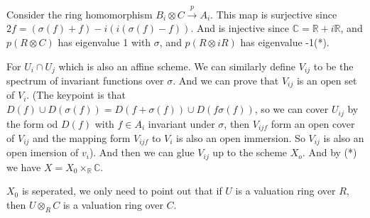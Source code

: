 \documentclass[10pt,letterpaper]{article}
\newcommand{\R}{\mathbb{R}}
\newcommand{\C}{\mathbb{C}}
\theoremstyle{plain}
\theoremstyle{definition}
\theoremstyle{remark}
\begin{document}
\begin{itemize}
\begin{enumerate}
Consider the ring homomorphism $B_{i}\otimes C \xrightarrow{p}  A_{i}$. This map is surjective since $2f=(\sigma(f)+f)-i(i(\sigma(f)-f))$. And is injective since $\C =\R +i \R$, and $p(R\otimes C)$ has eigenvalue 1 with $\sigma$, and $p (R\otimes i R)$ has eigenvalue -1(*).

For $U_{i}\cap U_{j}$ which is also an affine scheme. We can similarly define $V_{ij}$ to be the spectrum of invariant functions over $\sigma$. And we can prove that $V_{ij}$ is an open set of $V_{i}$. (The keypoint is that $D(f) \cup D(\sigma(f))= D(f+\sigma(f))\cup D(f\sigma(f))$, so we can cover $U_{ij}$ by the form od $D(f)$ with $f \in A_{i}$ invariant under $\sigma$, then $V_{ijf}$ form  an open cover of $V_{ij}$ and the mapping form $V_{ijf}$ to $V_{i}$ is also an open immersion. So $V_{ij}$ is also an open imersion of $v_{i}$). And then we can glue $V_{ij}$ up to the scheme $X_{o}$. And by (*) we have $X=X_{0}\times_{\R} \C$. 

$X_{0}$ is seperated, we only need to point out that if $U$ is a valuation ring over $R$, then $U\otimes_{R}C$ is a valuation ring over $C$.


\end{enumerate}
\end{itemize}
\end{document}
